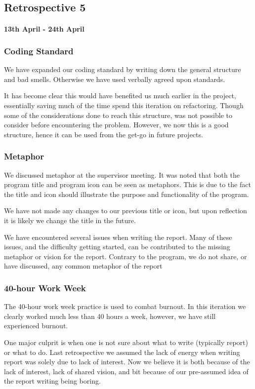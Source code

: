 \subsection*{Retrospective 5}
\paragraph{13th April - 24th April}

\subsubsection{Coding Standard}
We have expanded our coding standard by writing down the general structure and bad smells. Otherwise we have used verbally agreed upon standards.

It has become clear this would have benefited us much earlier in the project, essentially saving much of the time spend this iteration on refactoring. Though some of the considerations done to reach this structure, was not possible to consider before encountering the problem.
However, we now this is a good structure, hence it can be used from the get-go in future projects. 


\subsubsection{Metaphor}
We discussed metaphor at the supervisor meeting. It was noted that both the program title and program icon can be seen as metaphors. This is due to the fact the title and icon should illustrate the purpose and functionality of the program.

We have not made any changes to our previous title or icon, but upon reflection it is likely we change the title in the future.

We have encountered several issues when writing the report. Many of these issues, and the difficulty getting started, can be contributed to the missing metaphor or vision for the report. Contrary to the program, we do not share, or have discussed, any common metaphor of the report

\subsubsection{40-hour Work Week}
The 40-hour work week practice is used to combat burnout.
In this iteration we clearly worked much less than 40 hours a week, however, we have still experienced burnout.

One major culprit is when one is not sure about what to write (typically report) or what to do.
Last retrospective we assumed the lack of energy when writing report was solely due to lack of interest. Now we believe it is both because of the lack of interest, lack of shared vision, and bit because of our pre-assumed idea of the report writing being boring.

